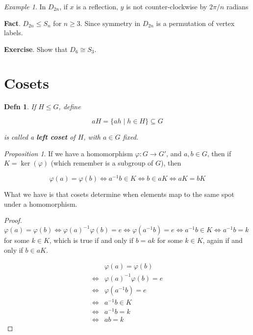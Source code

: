 \documentclass[12pt]{article}
\def\phi{\varphi}
\newtheorem{definition}{Defn}
\theoremstyle{remark}
\newtheorem{proposition}{Proposition}
\theoremstyle{remark}
\theoremstyle{remark}
\newtheorem{example}{Example}
\theoremstyle{remark}
\theoremstyle{remark}
\begin{document}
\begin{example}
  In $D_{2n}$, if $x$ is a reflection, $y$ is not counter-clockwise by $2 \pi /
  n$ radians
\end{example}

{\bf Fact}. $D_{2n} \le S_n$ for $n \ge 3$. Since symmetry in $D_{2n}$ is a
permutation of vertex labels.

{\bf Exercise}. Show that $D_6 \cong S_3$.

\section{Cosets}

\begin{definition}
  If $H \le G$, define

  \[
    aH = \{ ah \mid h \in H \} \subseteq G
  \]

  is called a {\bf left coset} of $H$, with $a \in G$ fixed.
\end{definition}

\begin{proposition}
  If we have a homomorphism $\phi: G \to G'$, and $a, b \in G$,
  then if $K = \ker(\phi)$ (which remember is a subgroup of $G$), then

  \[
    \phi(a) = \phi(b) \Leftrightarrow a^{-1}b \in K \Leftrightarrow b \in a K
    \Leftrightarrow a K = b K
  \]

  What we have is that cosets determine when elements map to the same spot under a
  homomorphism.
\end{proposition}

\begin{proof}
  $\phi(a) = \phi(b) \Leftrightarrow \phi(a)^{-1}\phi(b) = e \Leftrightarrow
  \phi(a^{-1}b) = e \Leftrightarrow a^{-1}b \in K \Leftrightarrow a^{-1}b = k$ for
  some $k \in K$, which is true if and only if $b = ak$ for some $k \in K$, again
  if and only if $b \in a K$.

  \begin{align*}
    &\phi(a) = \phi(b) \\
    \Leftrightarrow &\phi(a)^{-1}\phi(b) = e \\
    \Leftrightarrow &\phi(a^{-1}b) = e \\
    \Leftrightarrow &a^{-1}b \in K \\
    \Leftrightarrow &a^{-1}b = k \\
    \Leftrightarrow &ab = k
  \end{align*}
\end{proof}
\end{document}
